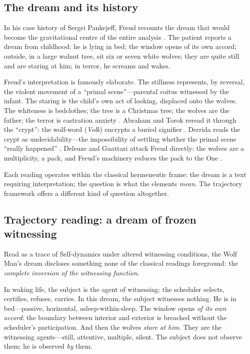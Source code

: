 \subsection{The dream and its history}

In his case history of Sergei Pankejeff, Freud recounts the dream that would become the gravitational centre of the entire analysis \cite{freud1918}.  The patient reports a dream from childhood: he is lying in bed; the window opens of its own accord; outside, in a large walnut tree, sit six or seven white wolves; they are quite still and are staring at him; in terror, he screams and wakes.

Freud's interpretation is famously elaborate.  The stillness represents, by reversal, the violent movement of a ``primal scene''---parental coitus witnessed by the infant.  The staring is the child's own act of looking, displaced onto the wolves.  The whiteness is bedclothes; the tree is a Christmas tree; the wolves are the father; the terror is castration anxiety \cite{freud1918}.  Abraham and Torok reread it through the ``crypt'': the wolf-word (\textit{Volk}) encrypts a buried signifier \cite{abraham1986}.  Derrida reads the crypt as undecidability---the impossibility of settling whether the primal scene ``really happened'' \cite{derrida1986}.  Deleuze and Guattari attack Freud directly: the wolves are a multiplicity, a pack, and Freud's machinery reduces the pack to the One \cite{deleuze1987}.

Each reading operates within the classical hermeneutic frame: the dream is a text requiring interpretation; the question is what the elements \textit{mean}.  The trajectory framework offers a different kind of question altogether.

\subsection{Trajectory reading: a dream of frozen witnessing}

Read as a trace of Self-dynamics under altered witnessing conditions, the Wolf Man's dream discloses something none of the classical readings foreground: the \textit{complete inversion of the witnessing function}.

In waking life, the subject is the agent of witnessing: the scheduler selects, certifies, refuses, carries.  In this dream, the subject witnesses nothing.  He is in bed---passive, horizontal, asleep-within-sleep.  The window opens \textit{of its own accord}: the boundary between interior and exterior is breached without the scheduler's participation.  And then the wolves \textit{stare at him}.  They are the witnessing agents---still, attentive, multiple, silent.  The subject does not observe them; he is observed \textit{by} them.

